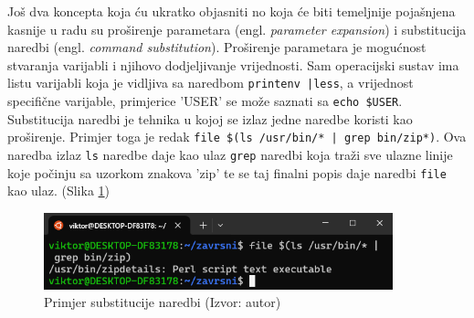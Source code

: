\documentclass{foi}
\begin{document}
\begin{flushleft}
Još dva koncepta koja ću ukratko objasniti no koja će biti temeljnije pojašnjena kasnije u radu su proširenje parametara (engl. \textit{parameter expansion}) i substitucija naredbi (engl. \textit{command substitution}). Proširenje parametara je mogućnost stvaranja varijabli i njihovo dodjeljivanje vrijednosti. Sam operacijski sustav ima listu varijabli koja je vidljiva sa naredbom \verb+printenv |less+, a vrijednost specifične varijable, primjerice 'USER' se može saznati sa \verb|echo $USER|. Substitucija naredbi je tehnika u kojoj se izlaz jedne naredbe koristi kao proširenje. Primjer toga je redak \verb+file $(ls /usr/bin/* | grep bin/zip*)+. Ova naredba izlaz \verb|ls| naredbe daje kao ulaz \verb|grep| naredbi koja traži sve ulazne linije koje počinju sa uzorkom znakova 'zip' te se taj finalni popis daje naredbi \verb|file| kao ulaz. (Slika \ref{fig:sub})
\end{flushleft}
\begin{figure}[H]
    \centering
    \includegraphics[width=0.9\textwidth]{slike/substitucija.png}
    \caption{Primjer substitucije naredbi (Izvor: autor)}
    \label{fig:sub}
\end{figure}
\end{document}
